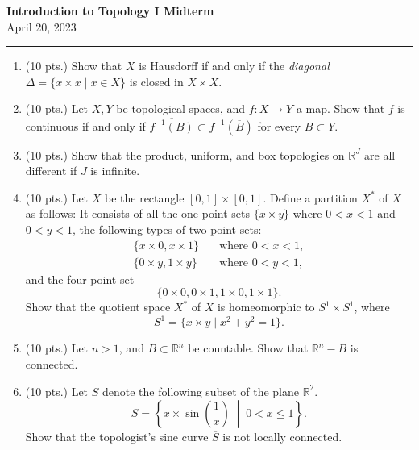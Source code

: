 \documentclass[12pt]{report}
\newcommand{\ra}{\rightarrow}
\newcommand{\cl}[1]{\overline{#1}}
\newcommand{\inv}{^{-1}}
\newcommand{\R}{\mathbb{R}}
\begin{document}
\begin{center}
    \textbf{\large Introduction to Topology I Midterm}\\
    April 20, 2023
\end{center}

\hrule
\begin{enumerate}
    \item (10 pts.) Show that \(X\) is Hausdorff if and only if the \textit{diagonal} \(\Delta = \{x \times x \mid x \in X\}\) is closed in \(X \times X\).

    \item (10 pts.) Let \(X, Y\) be topological spaces, and \(f : X \ra Y\) a map. Show that \(f\) is continuous if and only if \(\cl{f\inv(B)} \subset f\inv(\cl{B})\) for every \(B \subset Y\).

    \item (10 pts.) Show that the product, uniform, and box topologies on \(\R^J\) are all different if \(J\) is infinite.

    \item (10 pts.) Let \(X\) be the rectangle \([0, 1] \times [0, 1]\). Define a partition \(X^*\) of \(X\) as follows: It consists of all the one-point sets \(\{x \times y\}\) where \(0 < x < 1\) and \(0 < y < 1\), the following types of two-point sets:
          \[
              \begin{aligned}
                  \{x \times 0, x \times 1\} & \quad \text{where } 0 < x < 1, \\
                  \{0 \times y, 1 \times y\} & \quad \text{where } 0 < y < 1,
              \end{aligned}
          \]
          and the four-point set
          \[
              \{0 \times 0, 0 \times 1, 1 \times 0, 1 \times 1\}.
          \]
          Show that the quotient space \(X^*\) of \(X\) is homeomorphic to \(S^1 \times S^1\), where
          \[
              S^1 = \{x \times y \mid x^2 + y^2 = 1\}.
          \]

    \item (10 pts.) Let \(n > 1\), and \(B \subset \R^n\) be countable. Show that \(\R^n - B\) is connected.

    \item (10 pts.) Let \(S\) denote the following subset of the plane \(\R^2\).
          \[
              S = \left\{x \times \sin \left(\frac{1}{x}\right) \;\middle\vert\; 0 < x \leq 1 \right\}.
          \]
          Show that the topologist's sine curve \(\cl{S}\) is not locally connected.


\end{enumerate}
\end{document}
